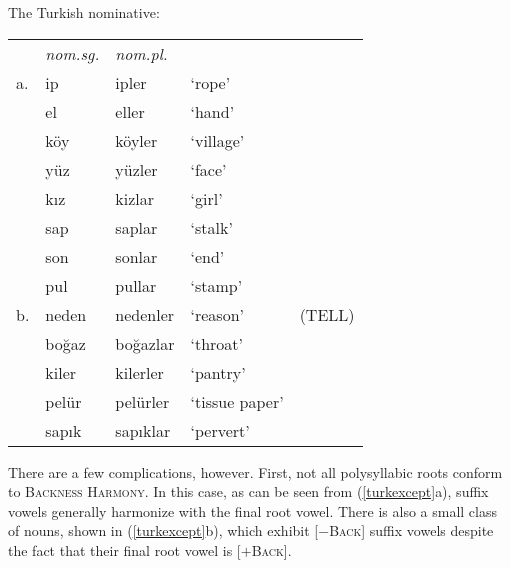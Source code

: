 \begin{example}
\label{turknom}
The Turkish nominative:

\vspace{0.5\baselineskip}
\begin{tabular}{l l l l l}
   & \emph{nom.sg.} & \emph{nom.pl.} \\
a. & ip             & ipler          & `rope' & \citep[][216]{Clements1982} \\
   & el             & eller          & `hand'    \\
   & köy            & köyler         & `village' \\
   & yüz            & yüzler         & `face'    \\
   & kız            & kizlar         & `girl'    \\
   & sap            & saplar         & `stalk'   \\
   & son            & sonlar         & `end'     \\
   & pul            & pullar         & `stamp'   \\
b. & neden          & nedenler       & `reason'  & (TELL) \\
   & boğaz          & boğazlar       & `throat'  \\
   & kiler          & kilerler       & `pantry'  \\
   & pelür          & pelürler       & `tissue paper' \\
   & sapık          & sapıklar       & `pervert' \\
\end{tabular}
\end{example}

There are a few complications, however. First, not all polysyllabic roots conform to \textsc{Backness Harmony}. In this case, as can be seen from (\ref{turkexcept}a), suffix vowels generally harmonize with the final root vowel. There is also a small class of nouns, shown in (\ref{turkexcept}b), which exhibit [$-$\textsc{Back}] suffix vowels despite the fact that their final root vowel is [$+$\textsc{Back}].

